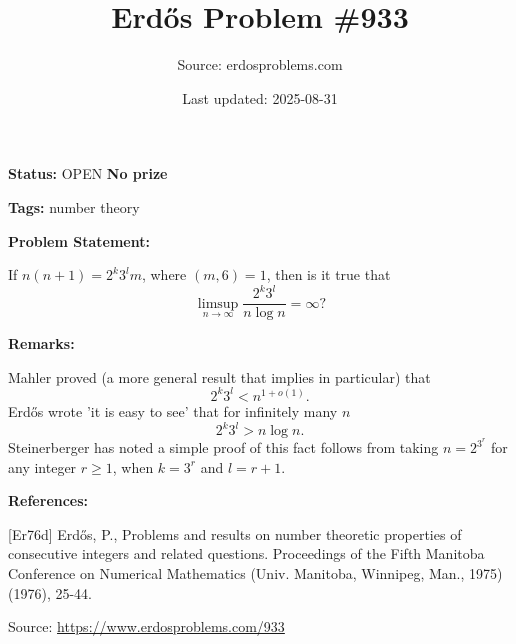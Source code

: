 \documentclass{article}
\title{Erd\H{o}s Problem \#933}
\date{Last updated: 2025-08-31}
\author{Source: erdosproblems.com}
\begin{document}
\maketitle

\noindent\textbf{Status:} OPEN \quad \textbf{No prize}

\noindent\textbf{Tags:} number theory

\medskip
\noindent\textbf{Problem Statement:}

If $n(n+1)=2^k3^lm$, where $(m,6)=1$, then is it true that\[\limsup_{n\to \infty} \frac{2^k3^l}{n\log n}=\infty?\]

\bigskip
\noindent\textbf{Remarks:}

Mahler proved (a more general result that implies in particular) that\[2^k3^l<n^{1+o(1)}.\]Erd\H{o}s \cite{Er76d} wrote 'it is easy to see' that for infinitely many $n$\[2^k3^l>n\log n.\]Steinerberger has noted a simple proof of this fact follows from taking $n=2^{3^r}$ for any integer $r\geq 1$, when $k=3^r$ and $l=r+1$.

\bigskip
\noindent\textbf{References:}

[Er76d] Erd\H{o}s, P., Problems and results on number theoretic properties of consecutive integers and related questions. Proceedings of the Fifth Manitoba Conference on Numerical Mathematics (Univ. Manitoba, Winnipeg, Man., 1975) (1976), 25-44.

\bigskip
\noindent\small{Source: \url{https://www.erdosproblems.com/933}}
\end{document}
